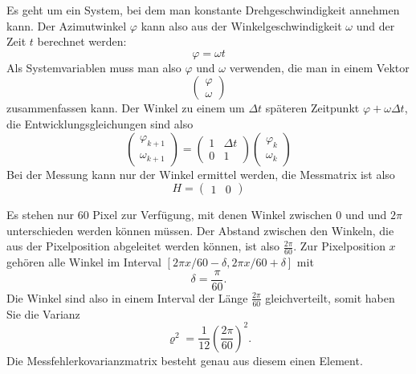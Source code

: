 \begin{loesung}
\begin{teilaufgaben}
\item
Es geht um ein System, bei dem man konstante Drehgeschwindigkeit annehmen
kann.
Der Azimutwinkel $\varphi$ kann also aus der Winkelgeschwindigkeit
$\omega$ und der Zeit $t$ berechnet werden:
\[
\varphi=\omega t
\]
Als Systemvariablen muss man also $\varphi$ und $\omega$ verwenden,
die man in einem Vektor
\[
\begin{pmatrix}\varphi\\\omega\end{pmatrix}
\]
zusammenfassen kann. Der Winkel zu einem um $\Delta t$ späteren Zeitpunkt
$\varphi+\omega\Delta t$, die Entwicklungsgleichungen sind also
\[
\begin{pmatrix}\varphi_{k+1}\\\omega_{k+1}\end{pmatrix}
=\begin{pmatrix}1&\Delta t\\0&1\end{pmatrix}
\begin{pmatrix}\varphi_k\\\omega_k\end{pmatrix}
\]
Bei der Messung kann nur der Winkel ermittel werden, die Messmatrix ist
also
\[
H=\begin{pmatrix}1&0\end{pmatrix}
\]
\item
Es stehen nur 60 Pixel zur Verfügung, mit denen Winkel zwischen $0$ und
und $2\pi$ unterschieden werden können müssen.
Der Abstand zwischen den Winkeln, die aus der Pixelposition abgeleitet
werden können, ist also $\frac{2\pi}{60}$. Zur Pixelposition $x$ gehören
alle Winkel im Interval $[2\pi x/60-\delta, 2\pi x/60+\delta]$ mit
\[
\delta=\frac{\pi}{60}.
\]
Die Winkel sind also in einem Interval der Länge $\frac{2\pi}{60}$ gleichverteilt,
somit haben Sie die Varianz
\[
\varrho^2=\frac1{12}\left(\frac{2\pi}{60}\right)^2.
\]
Die Messfehlerkovarianzmatrix besteht genau aus diesem einen Element.
\qedhere
\end{teilaufgaben}
\end{loesung}

